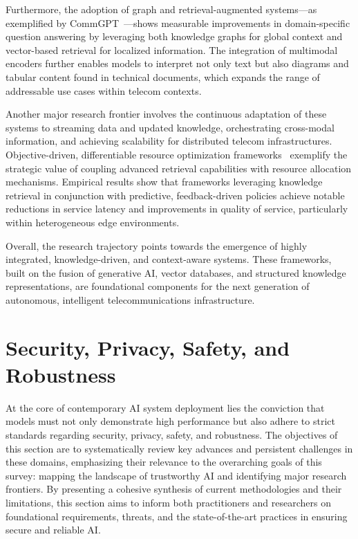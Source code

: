 \documentclass[sigconf]{acmart}
\begin{document}
Furthermore, the adoption of graph and retrieval-augmented systems---as exemplified by CommGPT~\cite{ref21}---shows measurable improvements in domain-specific question answering by leveraging both knowledge graphs for global context and vector-based retrieval for localized information. The integration of multimodal encoders further enables models to interpret not only text but also diagrams and tabular content found in technical documents, which expands the range of addressable use cases within telecom contexts.

Another major research frontier involves the continuous adaptation of these systems to streaming data and updated knowledge, orchestrating cross-modal information, and achieving scalability for distributed telecom infrastructures. Objective-driven, differentiable resource optimization frameworks~\cite{ref48} exemplify the strategic value of coupling advanced retrieval capabilities with resource allocation mechanisms. Empirical results show that frameworks leveraging knowledge retrieval in conjunction with predictive, feedback-driven policies achieve notable reductions in service latency and improvements in quality of service, particularly within heterogeneous edge environments.

Overall, the research trajectory points towards the emergence of highly integrated, knowledge-driven, and context-aware systems. These frameworks, built on the fusion of generative AI, vector databases, and structured knowledge representations, are foundational components for the next generation of autonomous, intelligent telecommunications infrastructure.

\section{Security, Privacy, Safety, and Robustness}
At the core of contemporary AI system deployment lies the conviction that models must not only demonstrate high performance but also adhere to strict standards regarding security, privacy, safety, and robustness. The objectives of this section are to systematically review key advances and persistent challenges in these domains, emphasizing their relevance to the overarching goals of this survey: mapping the landscape of trustworthy AI and identifying major research frontiers. By presenting a cohesive synthesis of current methodologies and their limitations, this section aims to inform both practitioners and researchers on foundational requirements, threats, and the state-of-the-art practices in ensuring secure and reliable AI.
\end{document}
